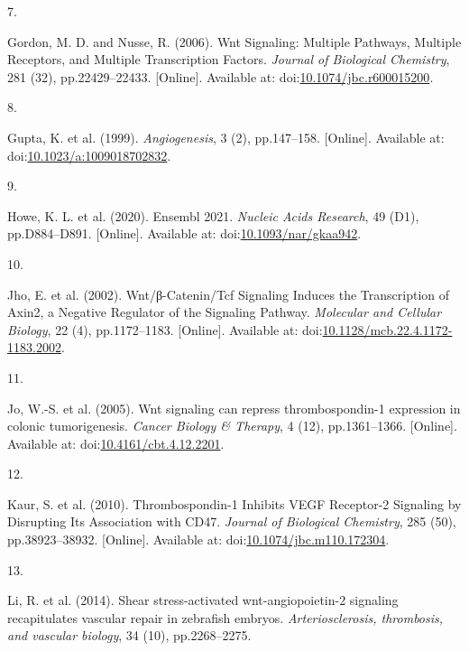 \documentclass[
  11pt,
]{article}
\newlength{\cslhangindent}
\newlength{\csllabelwidth}
\newlength{\cslentryspacingunit} %
\newenvironment{CSLReferences}[2] %
 {%
  \setlength{\parindent}{0pt}
  \ifodd #1
  \let\oldpar\par
  \def\par{\hangindent=\cslhangindent\oldpar}
  \fi
  \setlength{\parskip}{#2\cslentryspacingunit}
 }%
 {}
\newcommand{\CSLLeftMargin}[1]{\parbox[t]{\csllabelwidth}{#1}}
\newcommand{\CSLRightInline}[1]{\parbox[t]{\linewidth - \csllabelwidth}{#1}\break}
\begin{document}
\begin{CSLReferences}{0}{0}
\leavevmode{}%
\CSLLeftMargin{7. }
\CSLRightInline{Gordon, M. D. and Nusse, R. (2006). {Wnt Signaling: Multiple Pathways, Multiple Receptors, and Multiple Transcription Factors}. \emph{Journal of Biological Chemistry}, 281 (32), pp.22429--22433. {[}Online{]}. Available at: doi:\href{https://doi.org/10.1074/jbc.r600015200}{10.1074/jbc.r600015200}.}

\leavevmode{}%
\CSLLeftMargin{8. }
\CSLRightInline{Gupta, K. {et al.} (1999). \emph{Angiogenesis}, 3 (2), pp.147--158. {[}Online{]}. Available at: doi:\href{https://doi.org/10.1023/a:1009018702832}{10.1023/a:1009018702832}.}

\leavevmode{}%
\CSLLeftMargin{9. }
\CSLRightInline{Howe, K. L. {et al.} (2020). {Ensembl 2021}. \emph{Nucleic Acids Research}, 49 (D1), pp.D884--D891. {[}Online{]}. Available at: doi:\href{https://doi.org/10.1093/nar/gkaa942}{10.1093/nar/gkaa942}.}

\leavevmode{}%
\CSLLeftMargin{10. }
\CSLRightInline{Jho, E. {et al.} (2002). {Wnt/β-Catenin/Tcf Signaling Induces the Transcription of Axin2, a Negative Regulator of the Signaling Pathway}. \emph{Molecular and Cellular Biology}, 22 (4), pp.1172--1183. {[}Online{]}. Available at: doi:\href{https://doi.org/10.1128/mcb.22.4.1172-1183.2002}{10.1128/mcb.22.4.1172-1183.2002}.}

\leavevmode{}%
\CSLLeftMargin{11. }
\CSLRightInline{Jo, W.-S. {et al.} (2005). {Wnt signaling can repress thrombospondin-1 expression in colonic tumorigenesis}. \emph{Cancer Biology \& Therapy}, 4 (12), pp.1361--1366. {[}Online{]}. Available at: doi:\href{https://doi.org/10.4161/cbt.4.12.2201}{10.4161/cbt.4.12.2201}.}

\leavevmode{}%
\CSLLeftMargin{12. }
\CSLRightInline{Kaur, S. {et al.} (2010). {Thrombospondin-1 Inhibits VEGF Receptor-2 Signaling by Disrupting Its Association with CD47}. \emph{Journal of Biological Chemistry}, 285 (50), pp.38923--38932. {[}Online{]}. Available at: doi:\href{https://doi.org/10.1074/jbc.m110.172304}{10.1074/jbc.m110.172304}.}

\leavevmode{}%
\CSLLeftMargin{13. }
\CSLRightInline{Li, R. {et al.} (2014). {Shear stress-activated wnt-angiopoietin-2 signaling recapitulates vascular repair in zebrafish embryos}. \emph{Arteriosclerosis, thrombosis, and vascular biology}, 34 (10), pp.2268--2275.}


\end{CSLReferences}
\end{document}
